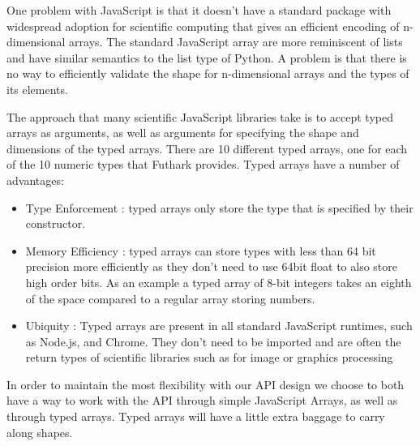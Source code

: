 \documentclass[11pt]{book}
\begin{document}
One problem with JavaScript is that it doesn't have a standard package with widespread adoption for scientific computing that gives an efficient encoding of n-dimensional arrays. The standard JavaScript array are more reminiscent of lists and have similar semantics to the list type of Python. A problem is that there is no way to efficiently validate the shape for n-dimensional arrays and the types of its elements. 




The approach that many scientific JavaScript libraries take is to accept typed arrays as arguments, as well as arguments for specifying the shape and dimensions of the typed arrays. There are 10 different typed arrays, one for each of the 10 numeric types that Futhark provides. Typed arrays have a number of advantages:

\begin{itemize}
    \item Type Enforcement : typed arrays only store the type that is specified by their constructor. 
    \item Memory Efficiency : typed arrays can store types with less than 64 bit precision more efficiently as they don't need to use 64bit float to also store high order bits. As an example a typed array of 8-bit integers takes an eighth of the space compared to a regular array storing numbers.
    \item Ubiquity : Typed arrays are present in all standard JavaScript runtimes, such as Node.js, and Chrome. They don't need to be imported and are often the return types of scientific libraries such as for image or graphics processing
\end{itemize}


In order to maintain the most flexibility with our API design we choose to both have a way to work with the API through simple JavaScript Arrays, as well as through typed arrays. Typed arrays will have a little extra baggage to carry along shapes.



\end{document}
